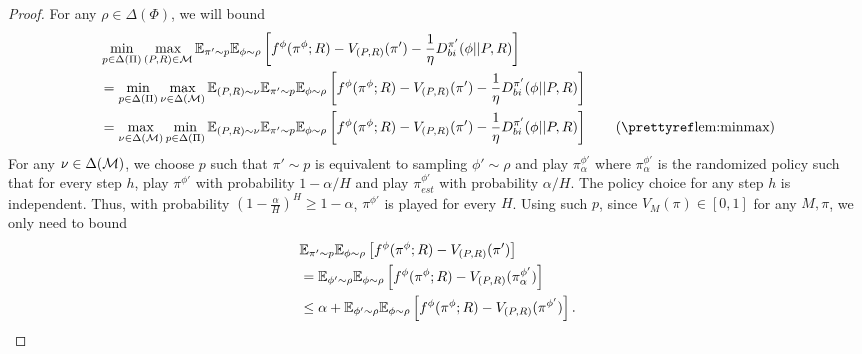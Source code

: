 \begin{proof}
For any $\rho \in \Delta(\Phi)$, we will bound
\begin{align*}
    &\min_{p \in \Delta(\Pi)}\max_{(P,R) \in \calM}\E_{\pi' \sim p}\E_{\phi \sim \rho}\left[f^{\phi}(\pi^{\phi}; R) - V_{(P, R)}(\pi')  - \frac{1}{\eta} D_{bi}^{\pi'}(\phi||P, R)\right] 
    \\&= \min_{p \in \Delta(\Pi)}\max_{\nu \in \Delta(\calM)}\E_{(P, R) \sim \nu}\E_{\pi' \sim p}\E_{\phi \sim \rho}\left[f^{\phi}(\pi^{\phi}; R) - V_{(P, R)}(\pi') - \frac{1}{\eta} D_{bi}^{\pi'}(\phi||P, R)\right]
    \\&= \max_{\nu \in \Delta(\calM)}\min_{p \in \Delta(\Pi)}\E_{(P, R) \sim \nu}\E_{\pi' \sim p}\E_{\phi \sim \rho}\left[f^{\phi}(\pi^{\phi}; R) - V_{(P, R)}(\pi') - \frac{1}{\eta} D_{bi}^{\pi'}(\phi||P, R)\right] \tag{\pref{lem:minmax}}
\end{align*}
For any $\nu \in \Delta(\mathcal{M})$, we choose $p$ such that $\pi' \sim p$ is equivalent to sampling $\phi' \sim \rho$ and play $\pi^{\phi'}_{\alpha}$ where $\pi^{\phi'}_{\alpha}$ is the randomized policy such that for every step $h$, play $\pi^{\phi'}$ with probability $1-\alpha/H$ and play $\pi_{est}^{\phi'}$ with probability $\alpha/H$. The policy choice for any step $h$ is independent. Thus, with probability $(1-\frac{\alpha}{H})^H \ge 1-\alpha$, $\pi^{\phi'}$ is played for every $H$. Using such $p$, since $V_M(\pi) \in [0,1]$ for any $M,\pi$, we only need to bound
\begin{align}
&\E_{\pi' \sim p}\E_{\phi \sim \rho}\left[f^{\phi}(\pi^{\phi}; R) - V_{(P,R)}(\pi')\right] \nonumber
\\&= \E_{\phi' \sim \rho}\E_{\phi \sim \rho}\left[f^{\phi}(\pi^{\phi}; R) - V_{(P,R)}(\pi^{\phi'}_{\alpha})\right] \nonumber
\\&\le \alpha  + \E_{\phi' \sim \rho}\E_{\phi \sim \rho}\left[f^{\phi}(\pi^{\phi}; R) - V_{(P,R)}(\pi^{\phi'}) \right]. 

\end{align}
\end{proof}
